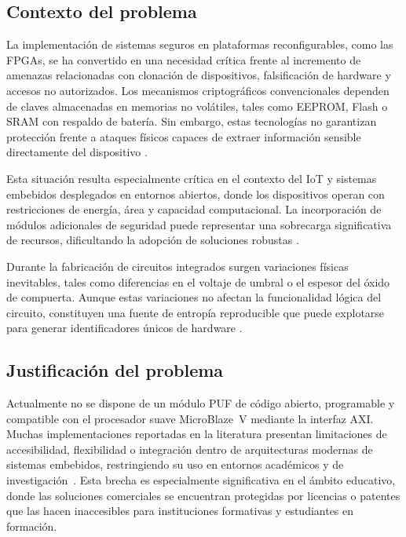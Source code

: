\subsection{Contexto del problema}

La implementación de sistemas seguros en plataformas reconfigurables, como las FPGAs,
se ha convertido en una necesidad crítica frente al incremento de amenazas relacionadas
con clonación de dispositivos, falsificación de hardware y accesos no autorizados.
Los mecanismos criptográficos convencionales dependen de claves almacenadas en memorias
no volátiles, tales como EEPROM, Flash o SRAM con respaldo de batería. Sin embargo,
estas tecnologías no garantizan protección frente a ataques físicos capaces de extraer
información sensible directamente del dispositivo \cite{hou_2019_lightweight}.

Esta situación resulta especialmente crítica en el contexto del IoT y sistemas embebidos
desplegados en entornos abiertos, donde los dispositivos operan con restricciones de
energía, área y capacidad computacional. La incorporación de módulos adicionales de
seguridad puede representar una sobrecarga significativa de recursos, dificultando la
adopción de soluciones robustas \cite{shamsoshoara_2020_puf, alhamarneh_2024_strengthening}.

Durante la fabricación de circuitos integrados surgen variaciones físicas inevitables,
tales como diferencias en el voltaje de umbral o el espesor del óxido de compuerta.
Aunque estas variaciones no afectan la funcionalidad lógica del circuito, constituyen
una fuente de entropía reproducible que puede explotarse para generar
identificadores únicos de hardware \cite{sudhanya_2016_silicon}.

\subsection{Justificación del problema}

Actualmente no se dispone de un módulo PUF de código abierto, programable y
compatible con el procesador suave MicroBlaze~V mediante la interfaz AXI.
Muchas implementaciones reportadas en la literatura presentan limitaciones de
accesibilidad, flexibilidad o integración dentro de arquitecturas modernas
de sistemas embebidos, restringiendo su uso en entornos académicos y de
investigación~\cite{lata_2023_fpgapuf, anandakumar_2021_fpgapufs}. Esta
brecha es especialmente significativa en el ámbito educativo, donde las
soluciones comerciales se encuentran protegidas por licencias o patentes que
las hacen inaccesibles para instituciones formativas y estudiantes en
formación.

